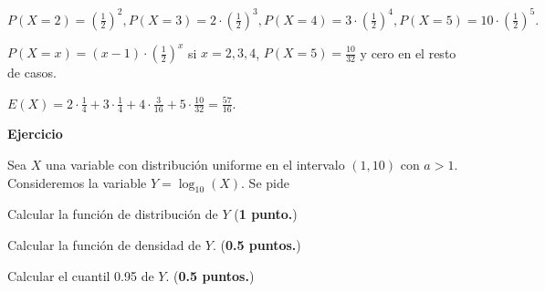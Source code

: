 \documentclass[12pt,spanish,es-nodecimaldot]{article}\usepackage[]{graphicx}\usepackage[]{color}
\newcounter{problemes}
\newcounter{punts} \def\thepunts{\arabic{punts}}
\def\probl{\textbf{\newline\noindent\hspace{-1cm} Ejercicio}\addtocounter{problemes}{1} \setcounter{punts}{0}
\medskip\noindent{\bf \theproblemes) }}
\def\punt{\addtocounter{punts}{1} \smallskip{\emph{\thepunts) }}}
\newif\ifsol
\begin{document}
$P(X=2)=\left(\frac{1}{2}\right)^2, P(X=3)=2\cdot\left(\frac{1}{2}\right)^3,P(X=4)=3\cdot\left(\frac{1}{2}\right)^4,P(X=5)=10\cdot \left(\frac{1}{2}\right)^5.$

$P(X=x)= (x-1)\cdot \left(\frac{1}{2}\right)^x$ si $x=2,3,4$, $P(X=5)=\frac{10}{32}$ y cero en el resto de casos.

$E(X)=2\cdot\frac{1}{4}+3\cdot \frac{1}{4}+ 4\cdot \frac{3}{16}+5\cdot \frac{10}{32}=\frac{57}{16}.$
\fi 

\probl Sea $X$  una variable  con distribución uniforme en el intervalo $(1,10)$ con  $a>1$. Consideremos la variable $Y=\log_{10}(X)$. Se pide

\punt Calcular la función de distribución  de $Y$ (\textbf{1 punto.}) 

\punt Calcular la función de densidad de $Y$. (\textbf{0.5 puntos.})

\punt Calcular el cuantil 0.95 de $Y$. (\textbf{0.5 puntos.})

\ifsol

Recordemos que 
$$
F_X(x)=\left\{
\begin{array}{ll} 
0 & \mbox{si} x\leq 0\\
\frac{x-1}{9} & \mbox{si} 0< x < 10\\
1 & \mbox{si} x\geq 10
\end{array}\right.
$$

La variable $Y$ tendrá por dominio $D_Y=(0,1)$.

Sea $y\in(0,1)$ entonces $F_Y(y)=P(Y\leq y)=P(\log(X)\leq y)=P(X\leq 10^y)=\frac{10^y-1}{9}$ ya que  como $0<y<1$ entonces
$0< 10^y < 10$.  Así que la función de distribución es 

$$
F_Y(y)=\left\{\begin{array}{ll} 
0 & \mbox{si} x\leq 0\\
\frac{10^y-1}{9} & \mbox{si} 0< y < 1\\
1 & \mbox{si} y\geq 1\\
\end{array}\right.
$$
 su densidad es 




$E(Y)=E(\log_{10}(X))=\int_{0}^{1} \log_{10}(X)\cdot 1 dx=$
\fi
\end{document}
